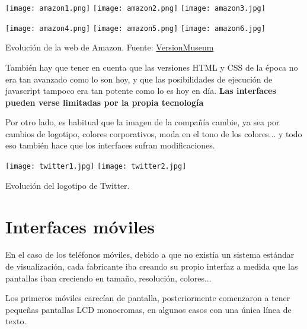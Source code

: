 {
    \hfill
    \texttt{[image: amazon1.png]}
    \hfill
    \texttt{[image: amazon2.png]}
    \hfill
    \texttt{[image: amazon3.jpg]}
    \hfill
}


{
    \hfill
    \texttt{[image: amazon4.png]}
    \hfill
    \texttt{[image: amazon5.png]}
    \hfill
    \texttt{[image: amazon6.jpg]}
    \hfill
}

\vspace{-15pt}
\begin{center}
    {\scriptsize  Evolución de la web de Amazon. Fuente: \href{https://www.versionmuseum.com/history-of/amazon-website}{VersionMuseum} }
\end{center}

También hay que tener en cuenta que las versiones HTML y CSS de la época no era tan avanzado como lo son hoy, y que las posibilidades de ejecución de javascript tampoco era tan potente como lo es hoy en día. \textbf{Las interfaces pueden verse limitadas por la propia tecnología}


Por otro lado, es habitual que la imagen de la compañía cambie, ya sea por cambios de logotipo, colores corporativos, moda en el tono de los colores... y todo eso también hace que los interfaces sufran modificaciones.

{
    \hfill
    \texttt{[image: twitter1.jpg]}
    \texttt{[image: twitter2.jpg]}
    \hfill
}

\vspace{-15pt}
\begin{center}
    {\scriptsize  Evolución del logotipo de Twitter.}
\end{center}


\section{Interfaces móviles}

En el caso de los teléfonos móviles, debido a que no existía un sistema estándar de visualización, cada fabricante iba creando su propio interfaz a medida que las pantallas iban creciendo en tamaño, resolución, colores...

Los primeros móviles carecían de pantalla, posteriormente comenzaron a tener pequeñas pantallas LCD monocromas, en algunos casos con una única línea de texto.


